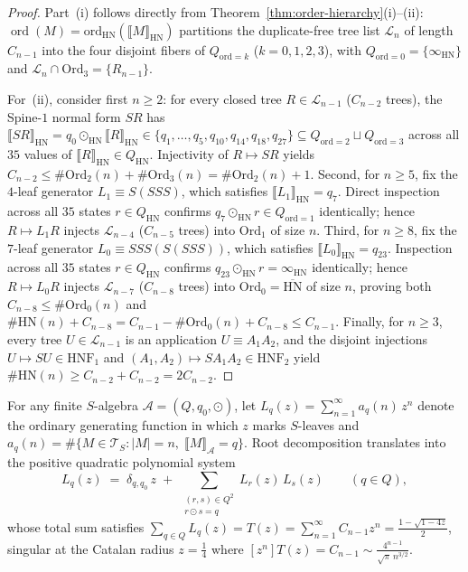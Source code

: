 \documentclass[11pt,reqno]{amsart}
\numberwithin{equation}{section}
\theoremstyle{plain}
\theoremstyle{definition}
\theoremstyle{remark}
\DeclareMathOperator{\ord}{ord}
\newcommand{\TS}{\mathcal{T}_S}
\newcommand{\HNF}{\mathrm{HNF}}
\newcommand{\HN}{\mathrm{HN}}
\newcommand{\sem}[1]{\llbracket #1 \rrbracket}
\begin{document}
\begin{proof}
Part~(i) follows directly from Theorem~\ref{thm:order-hierarchy}(i)--(ii): $\ord(M) = \mathrm{ord}_{\HN}(\sem{M}_{\HN})$ partitions the duplicate-free tree list $\mathcal{L}_n$ of length $C_{n-1}$ into the four disjoint fibers of $Q_{\mathrm{ord}=k}$ ($k = 0, 1, 2, 3$), with $Q_{\mathrm{ord}=0} = \{\infty_{\HN}\}$ and $\mathcal{L}_n \cap \mathrm{Ord}_3 = \{R_{n-1}\}$.

For~(ii), consider first $n \ge 2$: for every closed tree $R \in \mathcal{L}_{n-1}$ ($C_{n-2}$ trees), the Spine-$1$ normal form $S R$ has $\sem{S R}_{\HN} = q_0 \odot_{\HN} \sem{R}_{\HN} \in \{q_1, \dots, q_5, q_{10}, q_{14}, q_{18}, q_{27}\} \subseteq Q_{\mathrm{ord}=2} \sqcup Q_{\mathrm{ord}=3}$ across all $35$ values of $\sem{R}_{\HN} \in Q_{\HN}$. Injectivity of $R \mapsto S R$ yields $C_{n-2} \le \#\mathrm{Ord}_2(n) + \#\mathrm{Ord}_3(n) = \#\mathrm{Ord}_2(n) + 1$. Second, for $n \ge 5$, fix the $4$-leaf generator $L_1 \equiv S(S S S)$, which satisfies $\sem{L_1}_{\HN} = q_7$. Direct inspection across all $35$ states $r \in Q_{\HN}$ confirms $q_7 \odot_{\HN} r \in Q_{\mathrm{ord}=1}$ identically; hence $R \mapsto L_1 R$ injects $\mathcal{L}_{n-4}$ ($C_{n-5}$ trees) into $\mathrm{Ord}_1$ of size $n$. Third, for $n \ge 8$, fix the $7$-leaf generator $L_0 \equiv S S S (S(S S S))$, which satisfies $\sem{L_0}_{\HN} = q_{23}$. Inspection across all $35$ states $r \in Q_{\HN}$ confirms $q_{23} \odot_{\HN} r = \infty_{\HN}$ identically; hence $R \mapsto L_0 R$ injects $\mathcal{L}_{n-7}$ ($C_{n-8}$ trees) into $\mathrm{Ord}_0 = \overline{\HN}$ of size $n$, proving both $C_{n-8} \le \#\mathrm{Ord}_0(n)$ and $\#\HN(n) + C_{n-8} = C_{n-1} - \#\mathrm{Ord}_0(n) + C_{n-8} \le C_{n-1}$. Finally, for $n \ge 3$, every tree $U \in \mathcal{L}_{n-1}$ is an application $U \equiv A_1 A_2$, and the disjoint injections $U \mapsto S U \in \HNF_1$ and $(A_1, A_2) \mapsto S A_1 A_2 \in \HNF_2$ yield $\#\HN(n) \ge C_{n-2} + C_{n-2} = 2 C_{n-2}$.
\end{proof}

For any finite $S$-algebra $\mathcal{A} = (Q, q_0, \odot)$, let $L_q(z) = \sum_{n=1}^{\infty} a_q(n)\,z^n$ denote the ordinary generating function in which $z$ marks $S$-leaves and $a_q(n) = \#\{ M \in \TS : |M| = n,\; \sem{M}_{\mathcal{A}} = q \}$. Root decomposition translates into the positive quadratic polynomial system
\begin{equation}
\label{eq:ogf-system}
L_q(z) \;=\; \delta_{q, q_0}\,z \;+\; \sum_{\substack{(r, s) \in Q^2 \\ r \odot s = q}} L_r(z)\,L_s(z)
\qquad (q \in Q),
\end{equation}
whose total sum satisfies $\sum_{q \in Q} L_q(z) = T(z) = \sum_{n=1}^{\infty} C_{n-1} z^n = \frac{1 - \sqrt{1 - 4z}}{2}$, singular at the Catalan radius $z = \frac{1}{4}$ where $[z^n] T(z) = C_{n-1} \sim \frac{4^{n-1}}{\sqrt{\pi}\,n^{3/2}}$.
\end{document}
